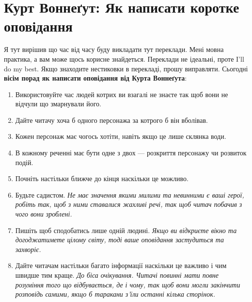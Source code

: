 \section*{Курт Воннеґут: Як написати коротке оповідання}

Я тут вирішив що час від часу буду викладати тут переклади. Мені мовна практика, а вам може щось корисне знайдеться. Переклади не ідеальні, проте I’ll do my best. Якщо знаходите нестиковки в перекладі, прошу виправляти. Сьогодні \textbf{вісім порад як написати оповідання від Курта Воннеґута}:

\begin{enumerate}

 \item Використовуйте час людей котрих ви взагалі не знаєте так щоб вони не  відчули що змарнували його.
 \item Дайте читачу хоча б одного персонажа за котрого б він вболівав.
 \item Кожен персонаж має чогось хотіти, навіть якщо це лише склянка води.
 \item В кожному реченні має бути одне з двох — розкриття персонажу чи розвиток подій.
 \item Почніть настільки ближче до кінця наскільки це можливо.
 \item Будьте садистом. \textit{Не має значення якими милими та невинними є ваші герої, робіть так, щоб з ними ставалися жахливі речі, так щоб читач побачив з чого вони зроблені.}
 \item Пишіть щоб сподобатись лише одній людині. \textit{Якщо ви відкриєте вікно та догоджатимете цілому світу, тоді ваше оповідання застудиться та захворіє.}
 \item Дайте читачам настільки багато інформації наскільки це важливо і чим швидше тим краще. \textit{До біса очікування. Читачі повинні мати повне розуміння того що відбувається, де і чому, так щоб вони могли закінчити розповідь самими, якщо б таракани з’їли останні кілька сторінок.}
\end{enumerate}